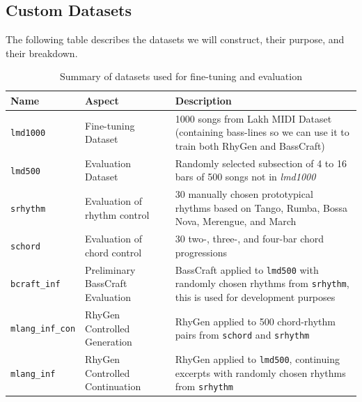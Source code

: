\subsection{Custom Datasets}
The following table describes the datasets we will construct, their purpose, and their breakdown. 
\begin{table}[H]
    \centering
    \renewcommand{\arraystretch}{1.3}
    \begin{tabular}{|l|p{4cm}|p{7cm}|}
        \hline
        \textbf{Name} & \textbf{Aspect} & \textbf{Description} \\
        \hline
        \texttt{lmd1000} & Fine-tuning Dataset & 1000 songs from Lakh MIDI Dataset \cite{Raffel_2016} (containing bass-lines so we can use it to train both RhyGen and BassCraft) \\
        \hline
        \texttt{lmd500} & Evaluation Dataset & Randomly selected subsection of 4 to 16 bars of 500 songs not in \textit{lmd1000} \\
        \hline
        \texttt{srhythm} & Evaluation of rhythm control & 30 manually chosen prototypical rhythms based on \cite{Chew_Volk_Lee_Dance_metric_weight_2005} Tango, Rumba, Bossa Nova, Merengue, and March \\
        \hline
        \texttt{schord} & Evaluation of chord control & 30 two-, three-, and four-bar chord progressions \\
        \hline
        \texttt{bcraft\_inf} & Preliminary BassCraft Evaluation & BassCraft applied to \texttt{lmd500} with randomly chosen rhythms from \texttt{srhythm}, this is used for development purposes \\
        \hline
        \texttt{mlang\_inf\_con} & RhyGen Controlled Generation & RhyGen applied to 500 chord-rhythm pairs from \texttt{schord} and \texttt{srhythm} \\
        \hline
        \texttt{mlang\_inf} & RhyGen Controlled Continuation & RhyGen applied to \texttt{lmd500}, continuing excerpts with randomly chosen rhythms from \texttt{srhythm} \\
        \hline
    \end{tabular}
    \caption{Summary of datasets used for fine-tuning and evaluation}
    \label{tab:dataset_summary}
\end{table}


